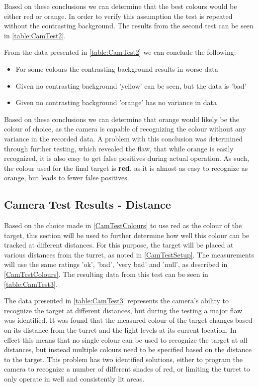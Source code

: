 Based on these conclusions we can determine that the best colours would be
either red or orange. In order to verify this assumption the test is repeated
without the contrasting background. The results from the second test can be seen
in \autoref{table:CamTest2}.


From the data presented in \autoref{table:CamTest2} we can conclude the
following:
\begin{itemize}
  \item For some colours the contrasting background results in worse data
  \item Given no contrasting background 'yellow' can be seen, but the data is
  'bad'
  \item Given no contrasting background 'orange' has no variance in data
\end{itemize}

Based on these conclusions we can determine that orange would likely be
the colour of choice, as the camera is capable of recognizing the colour without
any variance in the recorded data. A problem with this conclusion was determined
through further testing, which revealed the flaw, that while orange is easily
recognized, it is also easy to get false positives during actual operation. As
such, the colour used for the final target is \textbf{red}, as it is almost as
easy to recognize as orange, but leads to fewer false positives.

\subsection{Camera Test Results - Distance}\label{CamTestDistance}
Based on the choice made in \autoref{CamTestColours} to use red as the colour
of the target, this section will be used to further determine how well this
colour can be tracked at different distances. For this purpose, the target will
be placed at various distances from the turret, as noted in \autoref{CamTestSetup}.
The measurements will use the same ratings 'ok', 'bad', 'very bad' and 'null',
as described in \autoref{CamTestColours}. The resulting data from this test can be
seen in \autoref{table:CamTest3}.


The data presented in \autoref{table:CamTest3} represents the camera's ability
to recognize the target at different distances, but during the testing a major
flaw was identified. It was found that the measured colour of the target
changes based on its distance from the turret and the light levels at its
current location. In effect this means that no single colour can be used to
recognize the target at all distances, but instead multiple colours need to be
specified based on the distance to the target. This problem has two identified
solutions, either to program the camera to recognize a number of different
shades of red, or limiting the turret to only operate in well and consistently
lit areas.

